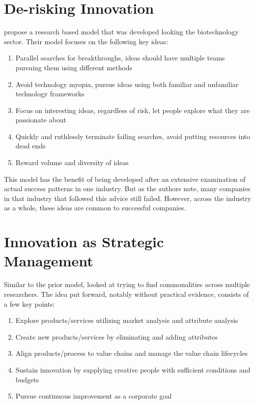 \documentclass[man]{apa7}
\begin{document}
\section{De-risking Innovation}
\label{sec:org097e3f5}

\textcite{drakemanRiskDeRiskingInnovation2020} propose a research based model that was developed looking the biotechnology sector. Their model focuses on the following key ideas:

\begin{enumerate}
\item Parallel searches for breakthroughs, ideas should have multiple teams pursuing them using different methods
\item Avoid technology myopia, pursue ideas using both familiar and unfamiliar technology frameworks
\item Focus on interesting ideas, regardless of risk, let people explore what they are passionate about
\item Quickly and ruthlessly terminate failing searches, avoid putting resources into dead ends
\item Reward volume and diversity of ideas
\end{enumerate}

This model has the benefit of being developed after an extensive examination of actual success patterns in one industry. But as the authors note, many companies in that industry that followed this advice still failed. However, across the industry as a whole, these ideas are common to successful companies. 

\section{Innovation as Strategic Management}
\label{sec:org4da1413}

Similar to the prior model, \textcite{negulescuInnovationManagementSource2020} looked at trying to find commonalities across multiple researchers. The idea put forward, notably without practical evidence, consists of a few key points:

\begin{enumerate}
\item Explore products/services utilizing market analysis and attribute analysis
\item Create new products/services by eliminating and adding attributes
\item Align products/process to value chains and manage the value chain lifecycles
\item Sustain innovation by supplying creative people with sufficient conditions and budgets
\item Pursue continuous improvement as a corporate goal
\end{enumerate}
\end{document}
